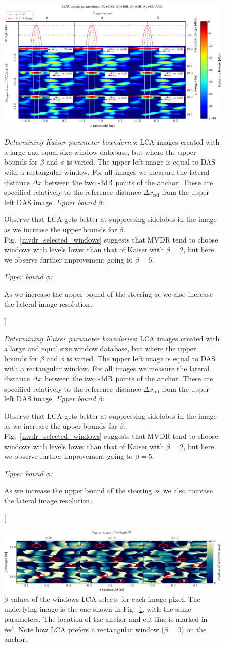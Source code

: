 \documentclass[10pt,journal,draftclsnofoot,onecolumn]{IEEEtran}
\let\MYoriglatexcaption\caption               %
\renewcommand{\caption}[2][\relax]{\MYoriglatexcaption[#2]{#2}}
\newcommand\Fig[1]{Fig.~\ref{#1}}
\newcommand\1{\vec 1}
\begin{document}
\begin{figure}[t]%
\includegraphics[width=\textwidth]{gfx/oversampling_mosaic_bounds.pdf}%
\caption{\emph{Determining Kaiser parameter boundaries}: LCA images created with a large and equal size window database, but where the upper bounds for $\beta$ and $\phi$ is varied. The upper left image is equal to DAS with a rectangular window. For all images we measure the lateral distance $\Delta x$ between the two -3dB points of the anchor. These are specified relatively to the reference distance  $\Delta x_\text{ref}$ from the upper left DAS image.
\newline
\emph{Upper bound $\beta$:}\hfill
\parbox[t]{.89\linewidth}{Observe that LCA gets better at suppressing sidelobes in the image as we increase the upper bounds for $\beta$. \Fig{mvdr_selected_windows} suggests that MVDR tend to choose windows with levels lower than that of Kaiser with $\beta=2$, but here we observe further improvement going to $\beta=5$.}\newline
\emph{Upper bound $\phi$:}\hfill
\parbox[t]{.89\linewidth}{As we increase the upper bound of the steering $\phi$, we also increase the lateral image resolution. }
}\label{oversampling_mosaic_bounds}
\end{figure}

\begin{figure}[t]%
\includegraphics[width=\textwidth]{gfx/oversampling_mosaic_bounds_lca_windows_beta.pdf}%
\caption{$\beta$-values of the windows LCA selects for each image pixel. The underlying image is the one shown in \Fig{oversampling_mosaic_bounds}, with the same parameters. The location of the anchor and cut line is marked in red. Note how LCA prefers a rectangular window ($\beta=0$) on the anchor.}\label{oversampling_mosaic_bounds_beta}
\end{figure} 
\end{document}
